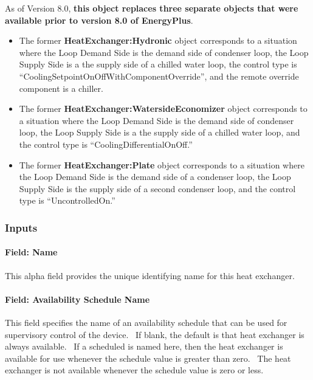 As of Version 8.0, \textbf{this object replaces three separate objects that were available prior to version 8.0 of EnergyPlus}.
\begin{itemize}
\item
    The former \textbf{HeatExchanger:Hydronic} object corresponds to a situation where the Loop Demand Side is the demand side of condenser loop,
    the Loop Supply Side is a the supply side of a chilled water loop, the control type is ``CoolingSetpointOnOffWithComponentOverride'',
    and the remote override component is a chiller.
\item
    The former \textbf{HeatExchanger:WatersideEconomizer} object corresponds to a situation where the Loop Demand Side is the demand side of condenser loop,
    the Loop Supply Side is a the supply side of a chilled water loop, and the control type is ``CoolingDifferentialOnOff.''
\item
    The former \textbf{HeatExchanger:Plate} object corresponds to a situation where the Loop Demand Side is the demand side of a condenser loop,
    the Loop Supply Side is the supply side of a second condenser loop, and the control type is ``UncontrolledOn.''
\end{itemize}

\subsubsection{Inputs}\label{inputs-15-002}

\paragraph{Field: Name}\label{field-name-13-001}

This alpha field provides the unique identifying name for this heat exchanger.

\paragraph{Field: Availability Schedule Name}\label{field-availability-schedule-name-001}

This field specifies the name of an availability schedule that can be used for supervisory control of the device.~ If blank, the default is that heat exchanger is always available.~ If a scheduled is named here, then the heat exchanger is available for use whenever the schedule value is greater than zero.~ The heat exchanger is not available whenever the schedule value is zero or less.

